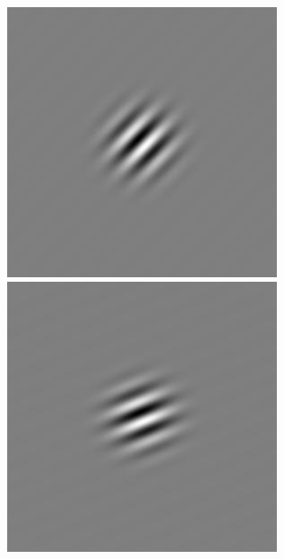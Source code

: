 \begin{figure}[ht]
\begin{center}
 \includegraphics[width=\columnwidth/9]{ch4/figures/rGabor4_2.jpg}
 \includegraphics[width=\columnwidth/9]{ch4/figures/rGabor4_3.jpg}

\end{center}
\end{figure}
